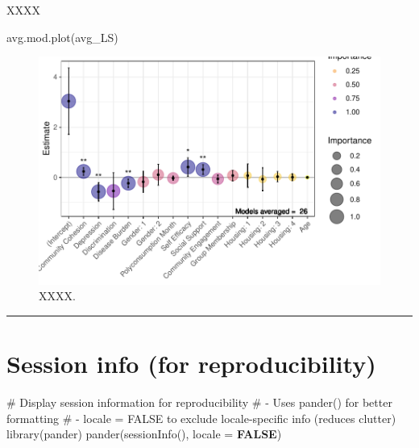 \documentclass[
  bookmarksnumbered]{article}
\newenvironment{Shaded}{\begin{snugshade}}{\end{snugshade}}
\newcommand{\AttributeTok}[1]{\textcolor[rgb]{0.80,0.80,0.80}{#1}}
\newcommand{\CommentTok}[1]{\textcolor[rgb]{0.50,0.62,0.50}{#1}}
\newcommand{\ConstantTok}[1]{\textcolor[rgb]{0.86,0.64,0.64}{\textbf{#1}}}
\newcommand{\FunctionTok}[1]{\textcolor[rgb]{0.94,0.94,0.56}{#1}}
\newcommand{\NormalTok}[1]{\textcolor[rgb]{0.80,0.80,0.80}{#1}}
\begin{document}
XXXX

\begin{Shaded}
\begin{Highlighting}[]
\FunctionTok{avg.mod.plot}\NormalTok{(avg\_LS)}
\end{Highlighting}
\end{Shaded}

\begin{figure}
\centering
\includegraphics{Supplementary_material_files/figure-latex/fig-avg-LS-1.pdf}
\caption{\label{fig:fig-avg-LS}XXXX.}
\end{figure}

\begin{center}\rule{0.5\linewidth}{0.5pt}\end{center}

\section{Session info (for reproducibility)}\label{session}

\begin{Shaded}
\begin{Highlighting}[]
\CommentTok{\# Display session information for reproducibility}
\CommentTok{\# {-} Uses \textasciigrave{}pander()\textasciigrave{} for better formatting}
\CommentTok{\# {-} \textasciigrave{}locale = FALSE\textasciigrave{} to exclude locale{-}specific info (reduces clutter)}
\FunctionTok{library}\NormalTok{(pander)}
\FunctionTok{pander}\NormalTok{(}\FunctionTok{sessionInfo}\NormalTok{(), }\AttributeTok{locale =} \ConstantTok{FALSE}\NormalTok{)}
\end{Highlighting}
\end{Shaded}
\end{document}
